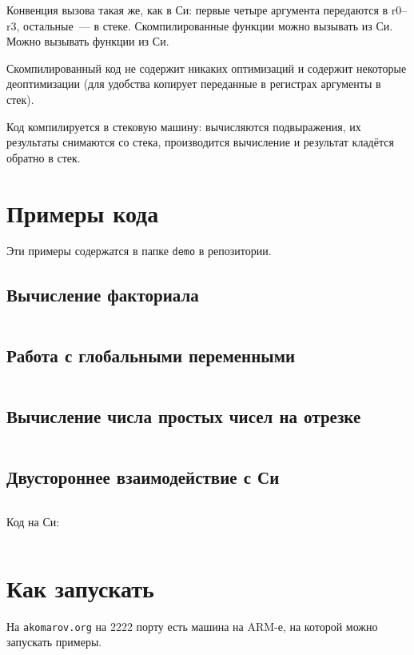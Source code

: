 Конвенция вызова такая же, как в Си: первые четыре аргумента
передаются в r0--r3, остальные~--- в стеке.
Скомпилированные функции можно вызывать из Си. 
Можно вызывать функции из Си.

Скомпилированный код не содержит никаких оптимизаций и содержит
некоторые деоптимизации (для удобства копирует переданные в регистрах
аргументы в стек).

Код компилируется в стековую машину: вычисляются подвыражения, их
результаты снимаются со стека, производится вычисление и результат
кладётся обратно в стек.

\section{Примеры кода}

Эти примеры содержатся в папке \texttt{demo} в репозитории.

\subsection{Вычисление факториала}
 
\inputminted{c}{../demo/fact.l}

\subsection{Работа с глобальными переменными}

\inputminted{c}{../demo/global.l}

\subsection{Вычисление числа простых чисел на отрезке}

\inputminted{c}{../demo/isPrime.l}

\subsection{Двустороннее взаимодействие с Си}

\inputminted{c}{../demo/callc.l}

Код на Си:

\inputminted{c}{../demo/call.c}

\section{Как запускать}

На \texttt{akomarov.org} на 2222 порту есть машина на ARM-е, на
которой можно запускать примеры.

